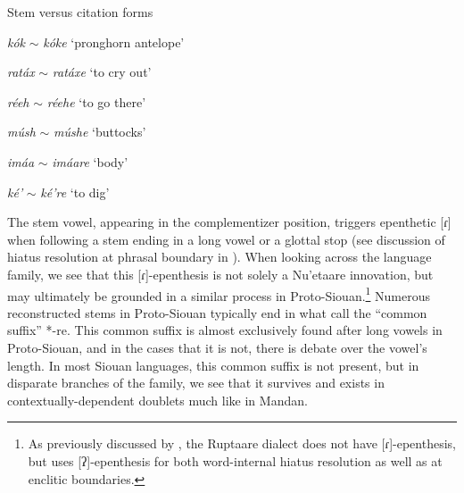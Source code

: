 \begin{exe}

\item\label{barevscitation} Stem versus citation forms

	\begin{xlist}

	\item \textit{kók} $\sim$ \textit{kóke} `pronghorn antelope'
	
	\item \textit{ratáx} $\sim$ \textit{ratáxe} `to cry out'

	\item \textit{réeh} $\sim$ \textit{réehe} `to go there'

	\item \textit{músh} $\sim$ \textit{múshe} `buttocks'
		
	\item \textit{imáa} $\sim$ \textit{imáare} `body'

	\item \textit{ké'} $\sim$ \textit{ké're} `to dig'

	
	\end{xlist}

\end{exe}

The stem vowel, appearing in the complementizer position, triggers epenthetic [ɾ] when following a stem ending in a long vowel or a glottal stop (see discussion of hiatus resolution at phrasal boundary in ). When looking across the language family, we see that this [ɾ]-epenthesis is not solely a Nu'etaare innovation,  but may ultimately be grounded in a similar process in Proto-Siouan.\footnote{As previously discussed by \citet{carter1991a}, the Ruptaare dialect does not have [ɾ]-epenthesis, but uses [ʔ]-epenthesis for both word-internal hiatus resolution as well as at enclitic boundaries.} Numerous reconstructed stems in Proto-Siouan typically end in what \citet{rankin2015} call the ``common suffix'' *-re. This common suffix is almost exclusively found after long vowels in Proto-Siouan, and in the cases that it is not, there is debate over the vowel's length. In most Siouan languages, this common suffix is not present, but in disparate branches of the family, we see that it survives and exists in contextually-dependent doublets much like in Mandan.

